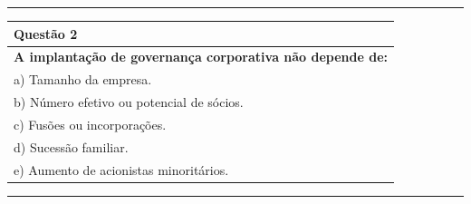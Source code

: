 \documentclass[
]{book}
\begin{document}
\begin{center}\rule{0.5\linewidth}{0.5pt}\end{center}

\begin{longtable}[]{@{}l@{}}
\toprule\noalign{}
\textbf{Questão 2} \\
\midrule\noalign{}
\endhead
\bottomrule\noalign{}
\endlastfoot
\textbf{A implantação de governança corporativa não depende de:} \\
a) Tamanho da empresa. \\
b) Número efetivo ou potencial de sócios. \\
c) Fusões ou incorporações. \\
d) Sucessão familiar. \\
e) Aumento de acionistas minoritários. \\
\end{longtable}

\begin{center}\rule{0.5\linewidth}{0.5pt}\end{center}
\end{document}
